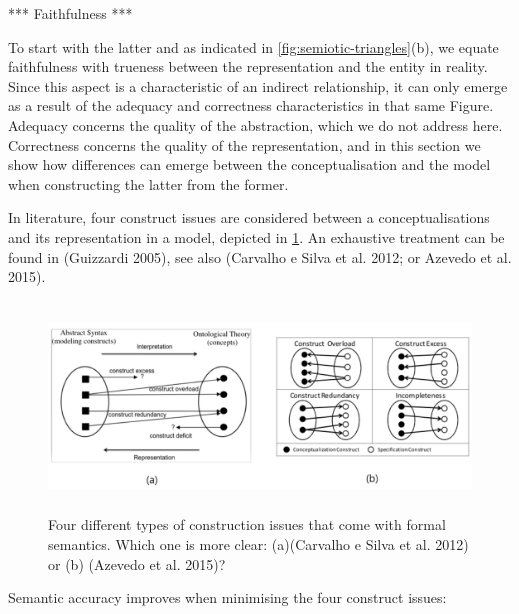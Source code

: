 \documentclass[a4paper,11pt,oneside,oldfontcommands]{memoir}
\theoremstyle{definition}
\theoremstyle{break}		%
\numberwithin{equation}{chapter}
\numberwithin{figure}{chapter}
\begin{document}
*** Faithfulness ***

To start with the latter and as indicated in
\cref{fig:semiotic-triangles}(b), we equate faithfulness with trueness
between the representation and the entity in reality. Since this aspect
is a characteristic of an indirect relationship, it can only emerge as a
result of the adequacy and correctness characteristics in that same
Figure. Adequacy concerns the quality of the abstraction, which we do
not address here. Correctness concerns the quality of the
representation, and in this section we show how differences can emerge
between the conceptualisation and the model when constructing the latter
from the former.

In literature, four construct issues are considered between a
conceptualisations and its representation in a model, depicted in
\cref{fig:construct-issues}. An exhaustive treatment can be found in
(Guizzardi 2005), see also (Carvalho e Silva et al. 2012; or Azevedo et
al. 2015).

\begin{figure}
\hypertarget{fig:construct-issues}{%
\centering
\includegraphics[width=5.55208in,height=2.1875in]{src/images/ConstructIssues.png}
\caption{Four different types of construction issues that come with
formal semantics. Which one is more clear: (a)(Carvalho e Silva et al.
2012) or (b) (Azevedo et al. 2015)?}\label{fig:construct-issues}
}
\end{figure}

Semantic accuracy improves when minimising the four construct issues:
\end{document}
